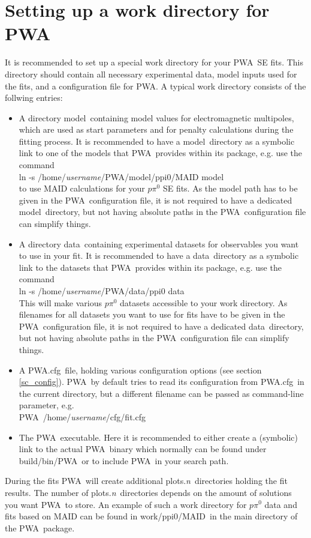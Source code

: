 \documentclass[a4paper,10pt]{article}
\def\PWA{\ttfamily PWA\rmfamily\ }
\def\tt{\ttfamily}
\def\rm{\rmfamily}
\begin{document}
\section{Setting up a work directory for \PWA}

It is recommended to set up a special work directory for your \PWA SE fits. This directory should contain
all necessary experimental data, model inputs used for the fits, and a configuration file for \tt PWA\rm.
A typical work directory consists of the follwing entries:
\begin{itemize}
\item A directory \tt model\rm\ containing model values for electromagnetic multipoles, which are used
as start parameters and for penalty calculations during the fitting process.
It is recommended to have a \tt model\rm\ directory as a symbolic link to one of the models that \PWA provides within 
its package, e.g. use the command\\
\tt ln -s /home/\textit{username}/PWA/model/ppi0/MAID model\rm\\
to use MAID calculations for your $p \pi^0$ SE fits. 
As the model path has to be given in the \PWA configuration file, it is not required to have a dedicated \tt model\rm\ directory, but
not having absolute paths in the \PWA configuration file can simplify things.

\item A directory \tt data\rm\ containing experimental datasets for observables you want to use in your fit.
It is recommended to have a \tt data\rm\ directory as a symbolic link to the datasets that \PWA provides within 
its package, e.g. use the command\\
\tt ln -s /home/\textit{username}/PWA/data/ppi0 data\rm\\
This will make various $p\pi^0$ datasets accessible to your work directory. As filenames for all datasets you want to use for fits
have to be given in the \PWA configuration file, it is not required to have a dedicated \tt data\rm\ directory, but
not having absolute paths in the \PWA configuration file can simplify things.

\item A \tt PWA.cfg\rm\ file, holding various configuration options (see section \ref{sc_config}).
\PWA by default tries to read its configuration from \tt PWA.cfg\rm\ in the current directory, but a different filename
can be passed as command-line parameter, e.g.\\
\PWA \tt /home/\textit{username}/cfg/fit.cfg\rm

\item The \PWA executable. Here it is recommended to either create a (symbolic) link to the actual \PWA binary
which normally can be found under \tt build/bin/PWA\rm\ or to include \PWA  in your search path.
\end{itemize}
During the fits \PWA will create additional \tt plots.\textit{n}\rm\ directories holding the fit results.
The number of \tt plots.\textit{n}\rm\ directories depends on the amount of solutions you want \PWA to store.
An example of such a work directory for $p \pi^0$ data and fits based on MAID can be found in
\tt work/ppi0/MAID\rm\ in the main directory of the \PWA package.
\end{document}
